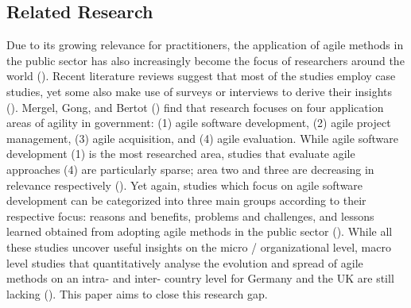 \subsection{Related Research}
Due to its growing relevance for practitioners, the application of agile methods in the public sector has also increasingly become the focus of researchers around the world (\cite{CarvalhoFernandes2016, Mergel2018, Vacari2015}). Recent literature reviews suggest that most of the studies employ case studies, yet some also make use of surveys or interviews to derive their insights (\cite{Vacari2015, Mergel2018}). Mergel, Gong, and Bertot (\cite*{Mergel2018}) find that research focuses on four application areas of agility in government: (1) agile software development, (2) agile project management, (3) agile acquisition, and (4) agile evaluation. While agile software development (1) is the most researched area, studies that evaluate agile approaches (4) are particularly sparse; area two and three are decreasing in relevance respectively (\cite{Mergel2018}). Yet again, studies which focus on agile software development can be categorized into three main groups according to their respective focus: reasons and benefits, problems and challenges, and lessons learned obtained from adopting agile methods in the public sector (\cite{Vacari2015}). While all these studies uncover useful insights on the micro / organizational level, macro level studies that quantitatively analyse the evolution and spread of agile methods on an intra- and inter- country level for Germany and the UK are still lacking (\cite{Vacari2015, Mergel2018}). This paper aims to close this research gap.